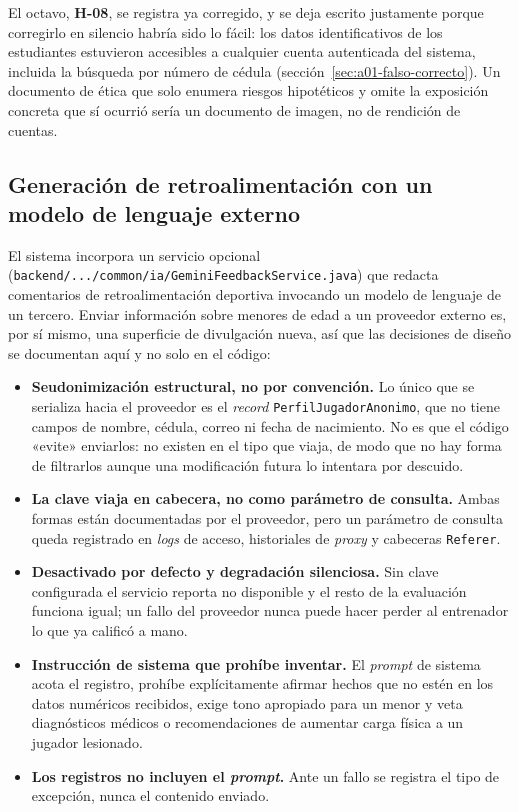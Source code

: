 \documentclass[11pt,a4paper]{article}
\newcommand{\ruta}[1]{\texttt{\footnotesize #1}}
\begin{document}
El octavo, \textbf{H-08}, se registra ya corregido, y se deja escrito
justamente porque corregirlo en silencio habría sido lo fácil: los datos
identificativos de los estudiantes estuvieron accesibles a cualquier cuenta
autenticada del sistema, incluida la búsqueda por número de cédula
(sección~\ref{sec:a01-falso-correcto}). Un documento de ética que solo
enumera riesgos hipotéticos y omite la exposición concreta que sí ocurrió
sería un documento de imagen, no de rendición de cuentas.

\subsection{Generación de retroalimentación con un modelo de lenguaje externo}
\label{sec:ia-feedback}

El sistema incorpora un servicio opcional
(\ruta{backend/.../common/ia/GeminiFeedbackService.java}) que redacta
comentarios de retroalimentación deportiva invocando un modelo de lenguaje
de un tercero. Enviar información sobre menores de edad a un proveedor
externo es, por sí mismo, una superficie de divulgación nueva, así que las
decisiones de diseño se documentan aquí y no solo en el código:

\begin{itemize}[leftmargin=*]
  \item \textbf{Seudonimización estructural, no por convención.} Lo único
    que se serializa hacia el proveedor es el \emph{record}
    \texttt{PerfilJugadorAnonimo}, que no tiene campos de nombre, cédula,
    correo ni fecha de nacimiento. No es que el código «evite» enviarlos:
    no existen en el tipo que viaja, de modo que no hay forma de filtrarlos
    aunque una modificación futura lo intentara por descuido.
  \item \textbf{La clave viaja en cabecera, no como parámetro de consulta.}
    Ambas formas están documentadas por el proveedor, pero un parámetro de
    consulta queda registrado en \emph{logs} de acceso, historiales de
    \emph{proxy} y cabeceras \texttt{Referer}.
  \item \textbf{Desactivado por defecto y degradación silenciosa.} Sin
    clave configurada el servicio reporta no disponible y el resto de la
    evaluación funciona igual; un fallo del proveedor nunca puede hacer
    perder al entrenador lo que ya calificó a mano.
  \item \textbf{Instrucción de sistema que prohíbe inventar.} El
    \emph{prompt} de sistema acota el registro, prohíbe explícitamente
    afirmar hechos que no estén en los datos numéricos recibidos, exige
    tono apropiado para un menor y veta diagnósticos médicos o
    recomendaciones de aumentar carga física a un jugador lesionado.
  \item \textbf{Los registros no incluyen el \emph{prompt}.} Ante un fallo
    se registra el tipo de excepción, nunca el contenido enviado.
\end{itemize}
\end{document}
